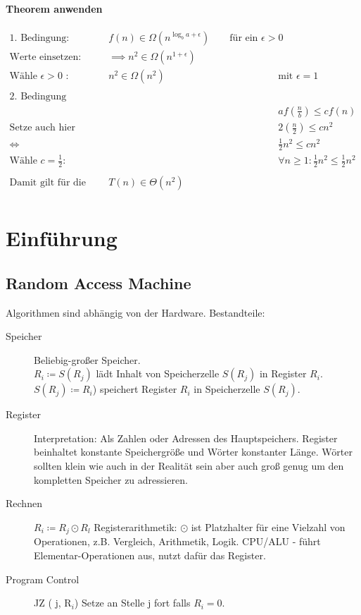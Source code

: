 \documentclass[a4paper]{scrartcl}
\begin{document}
	\paragraph{Theorem anwenden}
	\begin{align*}
	\text{1. Bedingung: } &f(n) \in \Omega (n^{\log_b a + \epsilon}) \qquad \text{für ein } \epsilon >0\\
	\text{Werte einsetzen: } &\implies n^2 \in \Omega(n^{1 + \epsilon})\\
	\text{Wähle \(\epsilon > 0\) : }  &n^2 \in \Omega(n^2)& \text{mit } \epsilon = 1 \\
	\\
	\text{2. Bedingung}\\
	 &&af(\frac{n}{b}) \leq cf(n)\\
	\text{Setze auch hier obige Werte ein: }& &2(\frac{n}{2}) \leq cn^2\\
	\iff&& \frac{1}{2}n^2 \leq cn^2\\
	\text{Wähle } c = \frac{1}{2}: &&\forall n \geq 1 : \frac{1}{2} n^2 \leq \frac{1}{2} n^2\\
	\\
	\text{Damit gilt für die Laufzeitfunktion: } &T(n) \in \Theta(n^2)\\ 
	\end{align*}
	
\section[Der Werkzeugkasten für den Werkzeugkasten]{Einführung}
	 \subsection{Random Access Machine}
	 	Algorithmen sind abhängig von der Hardware.
	 	Bestandteile: 
	 	\begin{description}
	 		\item[Speicher]
	 			Beliebig-großer Speicher.\\
	 				\( R_i \coloneqq S(R_{j}) \) lädt Inhalt von Speicherzelle  \(S(R_j) \) in Register \(R_i\).\\
	 			\( S(R_j) \coloneqq R_i \)) speichert Register \( R_i \) in Speicherzelle \( S( R_j ) \).
	 		\item[Register]
	 			Interpretation: Als Zahlen oder Adressen des Hauptspeichers. Register beinhaltet konstante Speichergröße und Wörter konstanter Länge. Wörter sollten klein wie auch in der Realität sein aber auch groß genug um den kompletten Speicher zu adressieren.
	 		\item[Rechnen]
	 			\( R_i \coloneqq R_j \odot R_l \) Registerarithmetik: \( \odot \) ist Platzhalter für eine Vielzahl von Operationen, z.B. Vergleich, Arithmetik, Logik. CPU/ALU - führt Elementar-Operationen aus, nutzt dafür das Register.
	 		\item[Program Control]
	 			JZ ( j, R\( _i \))  Setze an Stelle j fort falls \( R_i = 0 \).
	 			\reversemarginpar {}
	 			
	 	\end{description}
 	
\end{document}
